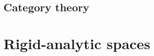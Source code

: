         \begin{appendices}
            \chapter{Category theory}
                \begin{abstract}
                    
                \end{abstract}
                
                \minitoc
                
                
                
                
        \end{appendices}
        
        \chapter{Rigid-analytic spaces}
            \begin{abstract}
                
            \end{abstract}
            
            \minitoc
            
            
            
            
            
            
            
            

